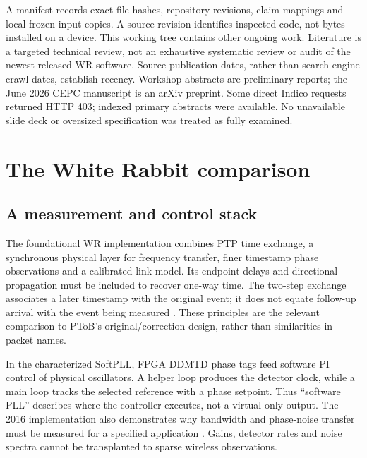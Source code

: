 \documentclass[11pt,letterpaper]{article}
\begin{document}
A manifest records exact file hashes, repository revisions, claim mappings and local frozen input copies. A source revision identifies inspected code, not bytes installed on a device. This working tree contains other ongoing work. Literature is a targeted technical review, not an exhaustive systematic review or audit of the newest released WR software. Source publication dates, rather than search-engine crawl dates, establish recency. Workshop abstracts are preliminary reports; the June 2026 CEPC manuscript is an arXiv preprint. Some direct Indico requests returned HTTP 403; indexed primary abstracts were available. No unavailable slide deck or oversized specification was treated as fully examined.

\section{The White Rabbit comparison}
\subsection{A measurement and control stack}
The foundational WR implementation combines PTP time exchange, a synchronous physical layer for frequency transfer, finer timestamp phase observations and a calibrated link model. Its endpoint delays and directional propagation must be included to recover one-way time. The two-step exchange associates a later timestamp with the original event; it does not equate follow-up arrival with the event being measured \cite{wr2011}. These principles are the relevant comparison to PToB's original/correction design, rather than similarities in packet names.

In the characterized SoftPLL, FPGA DDMTD phase tags feed software PI control of physical oscillators. A helper loop produces the detector clock, while a main loop tracks the selected reference with a phase setpoint. Thus ``software PLL'' describes where the controller executes, not a virtual-only output. The 2016 implementation also demonstrates why bandwidth and phase-noise transfer must be measured for a specified application \cite{characteristics}. Gains, detector rates and noise spectra cannot be transplanted to sparse wireless observations.
\end{document}

